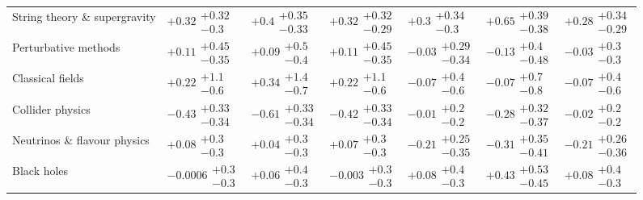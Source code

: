 \begin{table}[H]
\begin{tabular}{lllllll}
String theory \& supergravity & $\bm{+0.32}\substack{+0.32 \\ -0.3}$ & $\bm{+0.4}\substack{+0.35 \\ -0.33}$ & $\bm{+0.32}\substack{+0.32 \\ -0.29}$ & $\bm{+0.3}\substack{+0.34 \\ -0.3}$ & $\bm{+0.65}\substack{+0.39 \\ -0.38}$ & $+0.28\substack{+0.34 \\ -0.29}$ \\
Perturbative methods & $+0.11\substack{+0.45 \\ -0.35}$ & $+0.09\substack{+0.5 \\ -0.4}$ & $+0.11\substack{+0.45 \\ -0.35}$ & $-0.03\substack{+0.29 \\ -0.34}$ & $-0.13\substack{+0.4 \\ -0.48}$ & $-0.03\substack{+0.3 \\ -0.3}$ \\
Classical fields & $+0.22\substack{+1.1 \\ -0.6}$ & $+0.34\substack{+1.4 \\ -0.7}$ & $+0.22\substack{+1.1 \\ -0.6}$ & $-0.07\substack{+0.4 \\ -0.6}$ & $-0.07\substack{+0.7 \\ -0.8}$ & $-0.07\substack{+0.4 \\ -0.6}$ \\
Collider physics & $\bm{-0.43}\substack{+0.33 \\ -0.34}$ & $\bm{-0.61}\substack{+0.33 \\ -0.34}$ & $\bm{-0.42}\substack{+0.33 \\ -0.34}$ & $-0.01\substack{+0.2 \\ -0.2}$ & $-0.28\substack{+0.32 \\ -0.37}$ & $-0.02\substack{+0.2 \\ -0.2}$ \\
Neutrinos \& flavour physics & $+0.08\substack{+0.3 \\ -0.3}$ & $+0.04\substack{+0.3 \\ -0.3}$ & $+0.07\substack{+0.3 \\ -0.3}$ & $-0.21\substack{+0.25 \\ -0.35}$ & $-0.31\substack{+0.35 \\ -0.41}$ & $-0.21\substack{+0.26 \\ -0.36}$ \\
Black holes & $-0.0006\substack{+0.3 \\ -0.3}$ & $+0.06\substack{+0.4 \\ -0.3}$ & $-0.003\substack{+0.3 \\ -0.3}$ & $+0.08\substack{+0.4 \\ -0.3}$ & $+0.43\substack{+0.53 \\ -0.45}$ & $+0.08\substack{+0.4 \\ -0.3}$ \\

\end{tabular}
\end{table}
